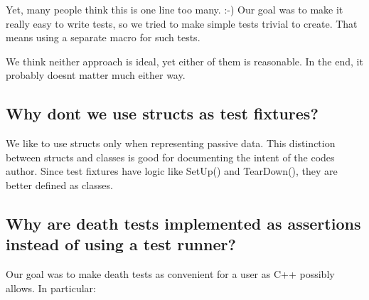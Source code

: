 Yet, many people think this is one line too many. \+:-\/) Our goal was to make it really easy to write tests, so we tried to make simple tests trivial to create. That means using a separate macro for such tests.

We think neither approach is ideal, yet either of them is reasonable. In the end, it probably doesn\textquotesingle{}t matter much either way.

\subsection*{Why don\textquotesingle{}t we use structs as test fixtures?}

We like to use structs only when representing passive data. This distinction between structs and classes is good for documenting the intent of the code\textquotesingle{}s author. Since test fixtures have logic like {\ttfamily Set\+Up()} and {\ttfamily Tear\+Down()}, they are better defined as classes.

\subsection*{Why are death tests implemented as assertions instead of using a test runner?}

Our goal was to make death tests as convenient for a user as C++ possibly allows. In particular\+:


